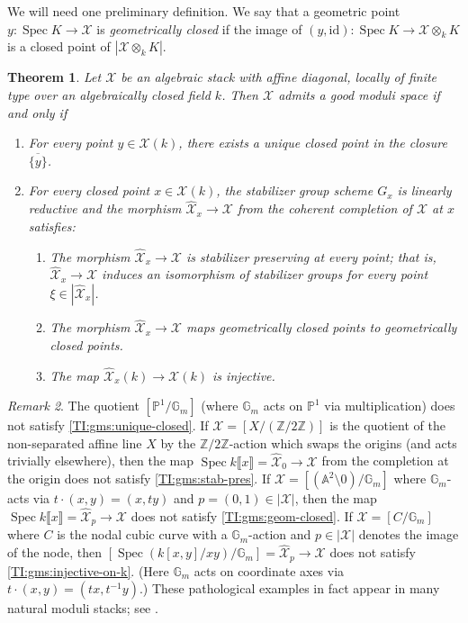 \documentclass[a4paper]{amsart}
\theoremstyle{plain}
\newtheorem{theorem}{Theorem}[section]
\theoremstyle{definition}
\theoremstyle{remark}
\newtheorem{remark}[theorem]{Remark}
\numberwithin{equation}{section}
\newcommand{\GG}{\mathbb{G}}
\newcommand{\PP}{\mathbb{P}}
\renewcommand\AA{\mathbb{A}}
\newcommand\ZZ{\mathbb{Z}}
\newcommand\cX{\mathcal{X}}
\newcommand\co{\colon}
\DeclareMathOperator{\Spec}{Spec}
\renewcommand{\hat}{\widehat}
\newcommand{\itemref}[1]{\eqref{#1}}
\begin{document}
We will need one preliminary definition.  We say that a geometric point $y \co \Spec K \to \cX$ is {\it geometrically closed} if the image of $(y, \mathrm{id}) \co \Spec K \to \cX \otimes_k K$ is a closed point of $|\cX \otimes_k K|$.


\begin{theorem} \label{T:gms} Let $\cX$ be an algebraic stack with affine diagonal, locally of finite type over an algebraically closed field $k$. Then $\cX$ admits a good moduli space if and only if 
\begin{enumerate}
\item\label{TI:gms:unique-closed}
  For every point $y \in \cX(k)$, there exists a unique closed point in the closure $\overline{ \{ y \}}$.
\item\label{TI:gms:cc} 
 For every closed point $x \in \cX(k)$, the stabilizer group scheme $G_x$ is linearly reductive and the morphism $\hat{\cX}_x \to \cX$ from the coherent completion of $\cX$ at $x$ satisfies:
	\begin{enumerate}
	\item\label{TI:gms:stab-pres}
      The morphism $\hat{\cX}_x \to \cX$ is stabilizer preserving at every point; that is, $\hat{\cX}_x \to \cX$ induces an isomorphism of stabilizer groups for every point $\xi \in |\hat{\cX}_x|$.
	\item\label{TI:gms:geom-closed}
      The morphism $\hat{\cX}_x \to \cX$ maps geometrically closed points to geometrically closed points.
	\item\label{TI:gms:injective-on-k}
      The map $\hat{\cX}_x(k) \to \cX(k)$ is injective.
	\end{enumerate}
\end{enumerate}
\end{theorem}

\begin{remark}
The quotient $[\PP^1 / \GG_m]$ (where $\GG_m$ acts on $\PP^1$ via multiplication) does not satisfy \itemref{TI:gms:unique-closed}.
If $\cX=[X/(\ZZ/2\ZZ)]$ is the quotient of the non-separated affine line $X$ by the $\ZZ/2\ZZ$-action which swaps the origins (and acts trivially elsewhere), then the map $\Spec k\llbracket x \rrbracket = \hat{\cX}_0 \to \cX$ from the completion at the origin does not satisfy \itemref{TI:gms:stab-pres}.
If $\cX=[(\AA^2 \setminus 0) / \GG_m]$ where $\GG_m$-acts via $t \cdot (x,y) = (x,ty)$ and $p=(0,1) \in |\cX|$, then the map $\Spec k\llbracket x \rrbracket = \hat{\cX}_{p} \to \cX$  does not satisfy \itemref{TI:gms:geom-closed}.
If  $\cX=[C/\GG_m]$ where $C$ is the nodal cubic curve with a $\GG_m$-action and $p \in |\cX|$ denotes the image of the node, then $[\Spec(k[x,y]/xy) / \GG_m] = \hat{\cX}_{p} \to \cX$ 
does not satisfy \itemref{TI:gms:injective-on-k}. (Here $\GG_m$ acts on coordinate axes via $t \cdot (x,y) = (tx, t^{-1}y)$.)  These pathological examples in fact appear in many natural moduli stacks; see \cite[App.~A]{afsw-good}.
\end{remark}
\end{document}
